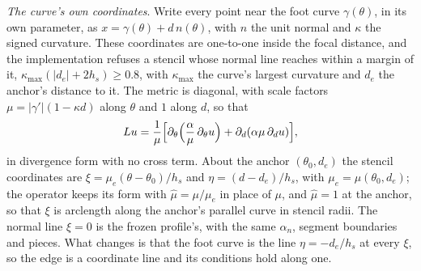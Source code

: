 \documentclass[11pt]{amsart}
\theoremstyle{definition}
\theoremstyle{remark}
\newcommand{\para}[1]{\par\smallskip\noindent\textit{#1}.\enspace}
\begin{document}
\para{The curve's own coordinates}
Write every point near the foot curve $\gamma(\theta)$, in its own
parameter, as $x = \gamma(\theta) + d\, n(\theta)$, with $n$ the unit normal
and $\kappa$ the signed curvature. These coordinates are one-to-one inside
the focal distance, and the implementation refuses a stencil whose normal
line reaches within a margin of it, $\kappa_{\max} (|d_e| + 2 h_s) \ge 0.8$,
with $\kappa_{\max}$ the curve's largest curvature and $d_e$ the anchor's
distance to it. The metric is diagonal, with scale factors
$\mu = |\gamma'| (1 - \kappa d)$ along $\theta$ and $1$ along $d$, so that
\begin{equation}
  \label{eq:curvilinear}
  L u = \frac{1}{\mu} \Bigl[ \partial_\theta \Bigl( \frac{\alpha}{\mu}\,
  \partial_\theta u \Bigr) + \partial_d (\alpha \mu\, \partial_d u) \Bigr],
\end{equation}
in divergence form with no cross term. About the anchor $(\theta_0, d_e)$
the stencil coordinates are $\xi = \mu_e (\theta - \theta_0) / h_s$ and
$\eta = (d - d_e) / h_s$, with $\mu_e = \mu(\theta_0, d_e)$; the operator keeps
its form with $\hat\mu = \mu / \mu_e$ in place of $\mu$, and $\hat\mu = 1$ at the
anchor, so that $\xi$ is arclength along the anchor's parallel curve in
stencil radii. The normal line $\xi = 0$ is the frozen profile's, with the
same $\alpha_n$, segment boundaries and pieces. What changes is that the
foot curve is the line $\eta = -d_e / h_s$ at every $\xi$, so the edge is a
coordinate line and its conditions hold along one.
\end{document}
